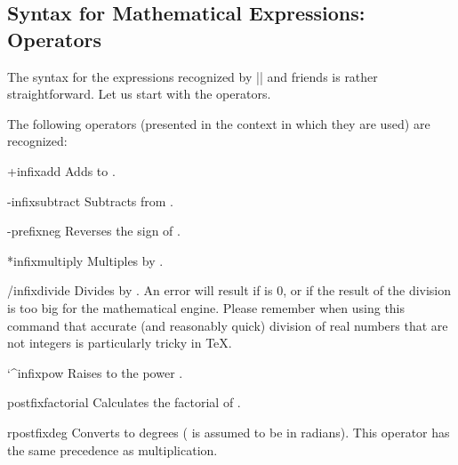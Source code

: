 \subsection{Syntax for Mathematical Expressions: Operators}

The syntax for the expressions recognized by |\pgfmathparse| and
friends is rather straightforward. Let us start with the operators.

\label{pgfmath-operators}

The following operators (presented in the context in which they are used)
are recognized:

\begin{math-operator}{+}{infix}{add}
 Adds  to .
\end{math-operator}

\begin{math-operator}{-}{infix}{subtract}
  Subtracts  from .
\end{math-operator}

\begin{math-operator}{-}{prefix}{neg}
  Reverses the sign of .
\end{math-operator}

\begin{math-operator}{*}{infix}{multiply}
  Multiples  by .
\end{math-operator}

\begin{math-operator}{/}{infix}{divide}
  Divides  by . An error will result if  is 0,
  or if the result of the division is too big for the mathematical
  engine. Please remember when using this command that accurate (and
  reasonably quick) division of real numbers that are not integers
  is particularly tricky in \TeX.
\end{math-operator}

\begin{math-operator}{\char`\^}{infix}{pow}
  Raises  to the power .
\end{math-operator}

\begin{math-operator}{\protect\exclamationmarktext}{postfix}{factorial}
  Calculates the factorial of .
\end{math-operator}

\begin{math-operator}{r}{postfix}{deg}
  Converts  to degrees ( is assumed to be in radians).
  This operator has the same precedence as multiplication.
\end{math-operator}

